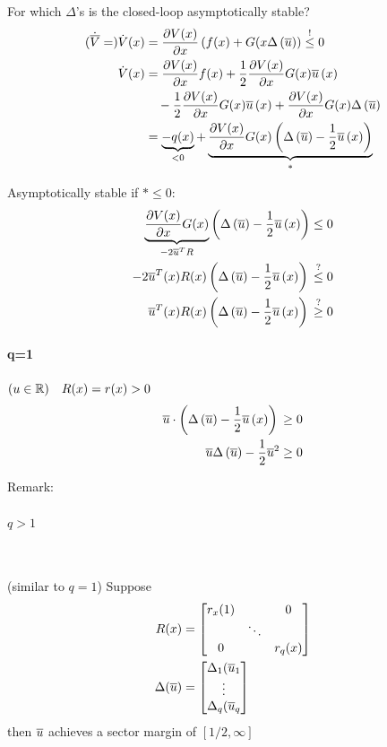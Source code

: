 For which $\Delta$'s is the closed-loop asymptotically stable?
\def\starlVal{
    \pdein{V(x)}{x}G(x)
    }
\def\starrVal{
    \paren{\Delta\paren{\ubar{}} - \frac{1}{2}\ubar{x}}
    }
\begin{align*}
    (\Vbard{} = ) \dot{V}(x) &= \pdein{V(x)}{x}\paren{f(x) + G(x\Delta\paren{\ubar{}}}
        \overset{!}{\leq} 0\\
    \dot{V}(x) &= \pdein{V(x)}{x}f(x) + \frac{1}{2}\pdein{V(x)}{x}G(x)\ubar{x}\\
        &\quad - \frac{1}{2}\pdein{V(x)}{x}G(x)\ubar{x}
        + \pdein{V(x)}{x}G(x)\Delta\paren{\ubar{}}\\
        &= \underbrace{-q(x)}_{<0} + \underbrace{\starlVal\starrVal}_{*}
\end{align*}%

Asymptotically stable if $* \leq 0$:
\begin{align*}
    \underbrace{\starlVal}_{-2\ubar{}^TR}
        \starrVal &\leq 0\\
    -2\ubar{}^T(x)R(x)\starrVal{}
        & \overset{?}{\leq} 0\\
    \ubar{}^T(x)R(x)\starrVal{}
        & \overset{?}{\geq} 0\\
\end{align*}

\paragraph{q=1} $( u \in \mathbb{R} ) \quad R(x) = r(x) > 0$
\begin{align*}
    \ubar{} \cdot \starrVal{} &\geq 0\\
    \ubar{} \Delta\paren{\ubar{}} - \frac{1}{2}\ubar{}^2 &\geq 0\\
\end{align*}%
\begin{figure}[H]
    \centering
    \def\svgwidth{0.7\columnwidth}
    
\end{figure}

Remark:
\begin{figure}[H]
    \centering
    \def\svgwidth{0.7\columnwidth}
    
\end{figure}

\paragraph{$q>1$}~\\
\begin{theorem}{{(similar to $q=1$)}}
Suppose
\begin{align}
R(x) &= \matr{r_x(1) & & 0\\
            & \ddots \\
        0 & & r_q(x)}\\
\Delta(\ubar{}) &= \matr{
    \Delta_1(\ubar{}_1\\
    \vdots\\
    \Delta_q(\ubar{}_q
    }
\end{align}
then $\ubar{}$ achieves a sector margin of $[1/2, \infty]$
\end{theorem}

